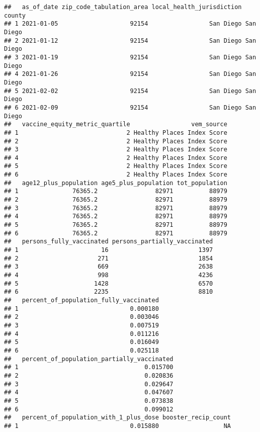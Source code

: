 \documentclass[
]{article}
\begin{document}
\begin{verbatim}
##   as_of_date zip_code_tabulation_area local_health_jurisdiction    county
## 1 2021-01-05                    92154                 San Diego San Diego
## 2 2021-01-12                    92154                 San Diego San Diego
## 3 2021-01-19                    92154                 San Diego San Diego
## 4 2021-01-26                    92154                 San Diego San Diego
## 5 2021-02-02                    92154                 San Diego San Diego
## 6 2021-02-09                    92154                 San Diego San Diego
##   vaccine_equity_metric_quartile                 vem_source
## 1                              2 Healthy Places Index Score
## 2                              2 Healthy Places Index Score
## 3                              2 Healthy Places Index Score
## 4                              2 Healthy Places Index Score
## 5                              2 Healthy Places Index Score
## 6                              2 Healthy Places Index Score
##   age12_plus_population age5_plus_population tot_population
## 1               76365.2                82971          88979
## 2               76365.2                82971          88979
## 3               76365.2                82971          88979
## 4               76365.2                82971          88979
## 5               76365.2                82971          88979
## 6               76365.2                82971          88979
##   persons_fully_vaccinated persons_partially_vaccinated
## 1                       16                         1397
## 2                      271                         1854
## 3                      669                         2638
## 4                      998                         4236
## 5                     1428                         6570
## 6                     2235                         8810
##   percent_of_population_fully_vaccinated
## 1                               0.000180
## 2                               0.003046
## 3                               0.007519
## 4                               0.011216
## 5                               0.016049
## 6                               0.025118
##   percent_of_population_partially_vaccinated
## 1                                   0.015700
## 2                                   0.020836
## 3                                   0.029647
## 4                                   0.047607
## 5                                   0.073838
## 6                                   0.099012
##   percent_of_population_with_1_plus_dose booster_recip_count
## 1                               0.015880                  NA

\end{verbatim}
\end{document}
